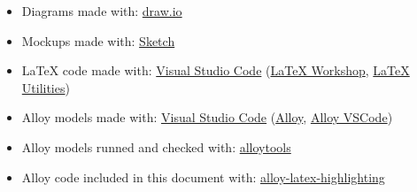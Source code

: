\begin{itemize}
    \item Diagrams made with: \href{http://www.draw.io}{draw.io}
    \item Mockups made with: \href{https://www.sketch.com/}{Sketch}
    \item LaTeX code made with: \href{https://code.visualstudio.com/}{Visual Studio Code} (\href{https://marketplace.visualstudio.com/items?itemName=James-Yu.latex-workshop}{LaTeX Workshop}, \href{https://marketplace.visualstudio.com/items?itemName=tecosaur.latex-utilities}{LaTeX Utilities})
    \item Alloy models made with: \href{https://code.visualstudio.com/}{Visual Studio Code} (\href{https://marketplace.visualstudio.com/items?itemName=ArashSahebolamri.alloy}{Alloy}, \href{https://marketplace.visualstudio.com/items?itemName=DongyuZhao.alloy-vscode}{Alloy VSCode})
    \item Alloy models runned and checked with: \href{https://alloytools.org/}{alloytools}
    \item Alloy code included in this document with: \href{https://github.com/Angtrim/alloy-latex-highlighting}{alloy-latex-highlighting}
\end{itemize}